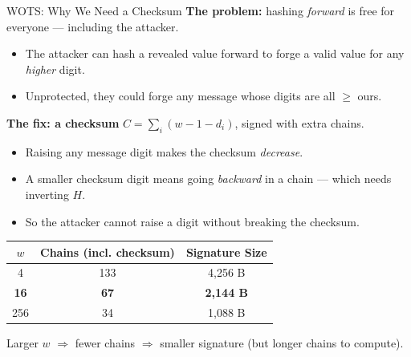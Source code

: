 \documentclass[aspectratio=169, 10pt]{beamer}
\begin{document}
\begin{frame}{WOTS: Why We Need a Checksum}
\textbf{The problem:} hashing \emph{forward} is free for everyone --- including the attacker.
\begin{itemize}
    \item The attacker can hash a revealed value forward to forge a valid value for any \emph{higher} digit.
    \item Unprotected, they could forge any message whose digits are all $\geq$ ours.
\end{itemize}

\vspace{4pt}
\textbf{The fix: a checksum} $C = \sum_i (w - 1 - d_i)$, signed with extra chains.
\begin{itemize}
    \item Raising any message digit makes the checksum \emph{decrease}.
    \item A smaller checksum digit means going \emph{backward} in a chain --- which needs inverting $H$.
    \item So the attacker cannot raise a digit without breaking the checksum.
\end{itemize}

\vspace{4pt}
\begin{center}
\scriptsize
\begin{tabular}{ccc}
\toprule
$w$ & Chains (incl. checksum) & Signature Size \\
\midrule
4 & 133 & 4,256 B \\
\rowcolor{accent!10}
\textbf{16} & \textbf{67} & \textbf{2,144 B} \\
256 & 34 & 1,088 B \\
\bottomrule
\end{tabular}
\end{center}
\centering\scriptsize Larger $w$ $\Rightarrow$ fewer chains $\Rightarrow$ smaller signature (but longer chains to compute).
\end{frame}
\end{document}
